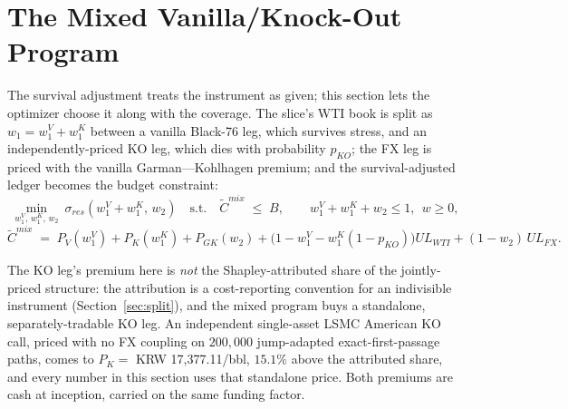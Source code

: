 \documentclass[11pt,a4paper]{article}
\begin{document}
\section{The Mixed Vanilla/Knock-Out Program}
\label{sec:mixed}

The survival adjustment treats the instrument as given; this section lets the optimizer choose it along with the coverage. The slice's WTI book is split as $w_1 = w_1^V + w_1^K$ between a vanilla Black-76 leg, which survives stress, and an independently-priced KO leg, which dies with probability $p_{KO}$; the FX leg is priced with the vanilla Garman---Kohlhagen premium; and the survival-adjusted ledger becomes the budget constraint:
\begin{equation}
\min_{w_1^V,\,w_1^K,\,w_2}\ \sigma_{res}(w_1^V{+}w_1^K,\,w_2)
\quad\text{s.t.}\quad
\widetilde C^{mix} \;\le\; B,\qquad w_1^V+w_1^K+w_2\le 1,\ \ w\ge0,
\label{eq:mixprog}
\end{equation}
\begin{equation}
\widetilde C^{mix} \;=\; P_V(w_1^V) + P_K(w_1^K) + P_{GK}(w_2)
+ \bigl(1 - w_1^V - w_1^K(1-p_{KO})\bigr) UL_{WTI} + (1-w_2)\, UL_{FX}.
\label{eq:mixledger}
\end{equation}

The KO leg's premium here is \emph{not} the Shapley-attributed share of the jointly-priced structure: the attribution is a cost-reporting convention for an indivisible instrument (Section~\ref{sec:split}), and the mixed program buys a standalone, separately-tradable KO leg. An independent single-asset LSMC American KO call, priced with no FX coupling on $200{,}000$ jump-adapted exact-first-passage paths, comes to $P_K = $ KRW 17{,}377.11/bbl, $15.1\%$ above the attributed share, and every number in this section uses that standalone price. Both premiums are cash at inception, carried on the same funding factor.
\end{document}
